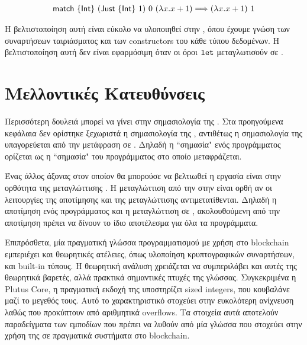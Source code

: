 \begin{align*}
  \operatorname{\textsf{match}}\ \{\operatorname{\textsf{Int}}\}\ (\operatorname{\textsf{Just}}\ \{\operatorname{\textsf{Int}}\}\ 1)\ 0\ (\lambda x . x+1) \Longrightarrow (\lambda x . x+1)\ 1
  \end{align*}

  Η βελτιστοποίηση αυτή είναι εύκολο να υλοποιηθεί στην \FIR{}, όπου έχουμε γνώση
  των συναρτήσεων ταιριάσματος και των constructors του κάθε τύπου δεδομένων.
  Η βελτιστοποίηση αυτή δεν είναι εφαρμόσιμη όταν οι όροι $\operatorname{\texttt{let}}$ μεταγλωτισούν σε \FOMF{}.


   \section{Μελλοντικές Κατευθύνσεις}



   Περισσότερη δουλειά μπορεί να γίνει στην σημασιολογία της \FIR{}. Στα προηγούμενα κεφάλαια δεν
   ορίστηκε ξεχωριστά η σημασιολογία της \FIR{}, αντιθέτως η σημασιολογία της υπαγορεύεται από την
   μετάφραση σε \FOMF{}. Δηλαδή η ``σημασία" ενός προγράμματος \FIR{} ορίζεται ως η ``σημασία"
   του προγράμματος \FOMF{} στο οποίο μεταφράζεται.

   Ένας άλλος άξονας στον οποίον θα μπορούσε να βελτιωθεί η εργασία είναι στην ορθότητα της μεταγλώττισης
   . Η μεταγλώττιση από την \FIR{} στην \FOMF{} είναι ορθή αν οι λειτουργίες της αποτίμησης και της μεταγλώττισης αντιμετατίθενται. Δηλαδή η αποτίμηση ενός προγράμματος \FIR{} και η μεταγλώττιση
   σε \FOMF{}, ακολουθούμενη από την αποτίμηση πρέπει να δίνουν το ίδιο αποτέλεσμα για όλα τα προγράμματα.

   Επιπρόσθετα, μία πραγματική γλώσσα προγραμματισμού με χρήση στο blockchain εμπεριέχει και
   θεωρητικές ατέλειες, όπως υλοποίηση κρυπτογραφικών συναρτήσεων, και built-in τύπους. Η θεωρητική
   ανάλυση χρειάζεται να συμπεριλάβει και αυτές της θεωρητικά βαρετές, αλλά πρακτικά σημαντικές πτυχές
   της γλώσσας. Συγκεκριμένα η Plutus Core, η πραγματική εκδοχή της \FOMF{} υποστηρίζει sized integers,
   που κουβαλάνε μαζί το μεγεθός τους. Αυτό το χαρακτηριστικό στοχεύει στην ευκολότερη ανίχνευση
   λαθώς που προκύπτουν από αριθμητικά overflows. Τα στοιχεία αυτά αποτελούν παραδείγματα των
   εμποδίων που πρέπει να λυθούν από μία γλώσσα που στοχεύει στην χρήση της σε πραγματικά συστήματα
   στο blockchain.
